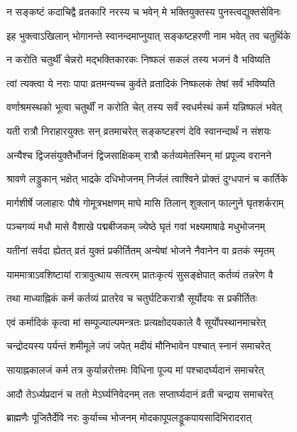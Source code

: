 \twolineshloka
{न सङ्कष्टं कदाचिद्वै व्रतकारि नरस्य च}
{भवेन् मे भक्तियुक्तस्य पुनस्त्वद्युक्तसेविनः} %

\twolineshloka
{इह भुक्त्वाऽखिलान् भोगानन्ते स्वानन्दमाप्नुयात्}
{सङ्कष्टहरणी नाम भवेत् तव चतुर्थिके} %

\twolineshloka
{न करोति चतुर्थीं चेन्नरो मद्भक्तिकारकः}
{निष्फलं सकलं तस्य भजनं वै भविष्यति} %

\twolineshloka
{त्वां त्यक्त्वा ये नराः पापा व्रतमन्यच्च कुर्वते}
{व्रतादिकं निष्फलकं तेषां सर्वं भविष्यति} %

\twolineshloka
{वर्णाश्रमस्थको भूत्वा चतुर्थीं न करोति चेत्}
{तस्य सर्वं स्वधर्मस्थं कर्म यन्निष्फलं भवेत्} %

\twolineshloka
{यती रात्रौ निराहारयुक्तः सन् व्रतमाचरेत्}
{सङ्कष्टहरणं देवि स्वानन्दार्थं न संशयः} %

\twolineshloka
{अन्यैश्च द्विजसंयुक्तैर्भोजनं द्विजसाक्षिकम्}
{रात्रौ कर्तव्यमेतस्मिन् मां प्रपूज्य वरानने} %

\twolineshloka
{श्रावणे लड्डुकान् भक्षेत् भाद्रके दधिभोजनम्}
{निर्जलं त्वाश्विने प्रोक्तं दुग्धपानं च कार्तिके} %

\twolineshloka
{मार्गशीर्षे जलाहारः पौषे गोमूत्रभक्षणम्}
{माघे मासि तिलान् शुक्लान् फाल्गुने घृतशर्कराम्} %

\twolineshloka
{पञ्चगव्यं मधौ मासे वैशाखे पद्मबीजकम्}
{ज्येष्ठे घृतं गवां भक्ष्यमाषाढे मधुभोजनम्} %

\twolineshloka
{यतीनां सर्वदा ह्येतत् व्रतं युक्तं प्रकीर्तितम्}
{अन्येषां भोजने नैवानेन वा व्रतकं स्मृतम्} %

\twolineshloka
{याममात्राऽवशिष्टायां रात्रावुत्थाय सत्वरम्}
{प्रातःकृत्यं सुसङ्क्षेपात् कर्तव्यं तन्नरेण वै} %

\twolineshloka
{तथा माध्याह्निकं कर्म कर्तव्यं प्रातरेव च}
{चतुर्घटिकरात्रौ सूर्योदयः स प्रकीर्तितः} %

\twolineshloka
{एवं कर्मादिकं कृत्वा मां सम्पूज्याल्पमन्त्रतः}
{प्रत्यक्षोदयकाले वै सूर्योपस्थानमाचरेत्} %

\twolineshloka
{चन्द्रोदयस्य पर्यन्तं शमीमूले जपं जपेत्}
{मदीयं मौनिभावेन पश्चात् स्नानं समाचरेत्} %

\twolineshloka
{सायाह्नकालजं कर्म तत्र कुर्यान्नरोत्तमः}
{विधिना पूज्य मां पश्चादर्घ्यदानं समाचरेत्} %

\twolineshloka
{आदौ तेऽर्ध्यप्रदानं च ततो मेऽर्घ्यनिवेदनम्}
{ततः सप्तार्घ्यदानं व्रती चन्द्राय समाचरेत्} %

\twolineshloka
{ब्राह्मणैः पूजितैर्देवि नरः कुर्याच्च भोजनम्}
{मोदकापूपलड्डूकपायसादिभिरादरात्} %

